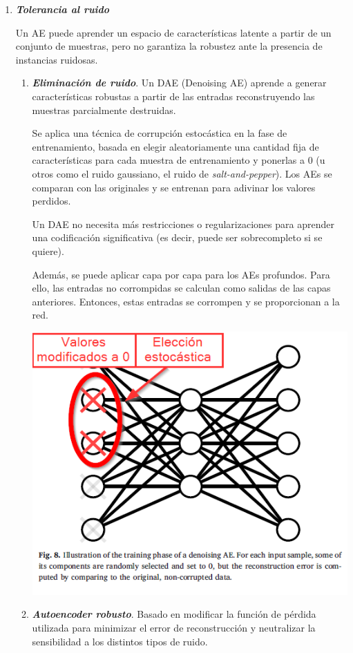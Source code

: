 \begin{enumerate}
\begin{enumerate}
            \item \textit{\textbf{Tolerancia al ruido}}
            \par Un AE puede aprender un espacio de características latente a partir de un conjunto de muestras, pero no garantiza la robustez ante la presencia de instancias ruidosas.
            
            \begin{enumerate}
                \item \textit{\textbf{Eliminación de ruido}}. Un DAE (Denoising AE) aprende a generar características robustas a partir de las entradas reconstruyendo las muestras parcialmente destruidas.
                
                Se aplica una técnica de corrupción estocástica en la fase de entrenamiento, basada en elegir aleatoriamente una cantidad fija de características para cada muestra de entrenamiento y ponerlas a 0 (u otros como el ruido gaussiano, el ruido de \textit{salt-and-pepper}). Los AEs se comparan con las originales y se entrenan para adivinar los valores perdidos.
                
                Un DAE no necesita más restricciones o regularizaciones para aprender una codificación significativa (es decir, puede ser sobrecompleto si se quiere).
                
                Además, se puede aplicar capa por capa para los AEs profundos. Para ello, las entradas no corrompidas se calculan como salidas de las capas anteriores. Entonces, estas entradas se corrompen y se proporcionan a la red.
                
                \begin{center}
                    \includegraphics[width = .4\textwidth]{imagenes/AE_ToleranciaRuido_EliminacionRuido.png}
                \end{center}
                
                \item \textit{\textbf{Autoencoder robusto}}. Basado en modificar la función de pérdida utilizada para minimizar el error de reconstrucción y neutralizar la sensibilidad a los distintos tipos de ruido.
                

\end{enumerate}
\end{enumerate}
\end{enumerate}
